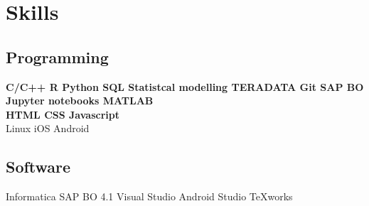 \documentclass[a4paper]{deedy-resume} %
\begin{document}






\section{Skills}

\subsection{Programming}
\textbf{C/C++ \textbullet{} R \textbullet{} Python  \textbullet{} SQL 
\textbullet Statistcal modelling\textbullet{} TERADATA \textbullet Git 
\textbullet SAP BO \textbullet{}  Jupyter notebooks \textbullet{} MATLAB } \\

\textbf{HTML \textbullet{} CSS \textbullet{} Javascript}\\
Linux \textbullet{} iOS \textbullet{} Android \textbullet{}
\sectionspace
\subsection{Software}
Informatica \textbullet{} SAP BO 4.1 \textbullet{} Visual Studio \textbullet  Android Studio 
\textbullet{} TeXworks

\end{document}
